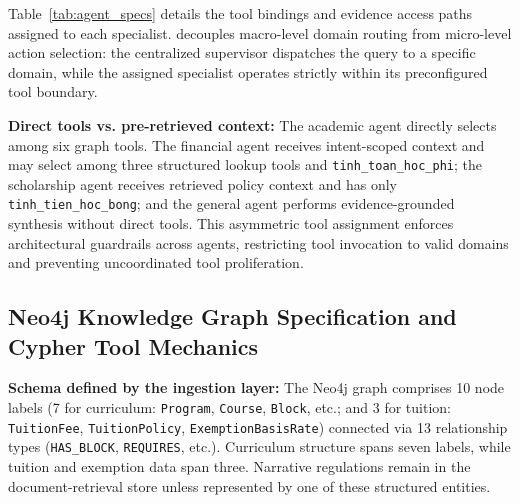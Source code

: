 Table~\ref{tab:agent_specs} details the tool bindings and evidence access paths assigned to each specialist. \system{} decouples macro-level domain routing from micro-level action selection: the centralized supervisor dispatches the query to a specific domain, while the assigned specialist operates strictly within its preconfigured tool boundary.

\begin{table}[h!]
\centering
\caption{Operational profiles and direct tool availability of the domain-specialized agents.}
\label{tab:agent_specs}
\end{table}

\textbf{Direct tools vs. pre-retrieved context:} The academic agent directly selects among six graph tools. The financial agent receives intent-scoped context and may select among three structured lookup tools and \texttt{tinh\_toan\_hoc\_phi}; the scholarship agent receives retrieved policy context and has only \texttt{tinh\_tien\_hoc\_bong}; and the general agent performs evidence-grounded synthesis without direct tools. This asymmetric tool assignment enforces architectural guardrails across agents, restricting tool invocation to valid domains and preventing uncoordinated tool proliferation.

\subsection{Neo4j Knowledge Graph Specification and Cypher Tool Mechanics}
\label{sec:neo4j_graph}

\textbf{Schema defined by the ingestion layer:}
The Neo4j graph comprises 10 node labels (7 for curriculum: \texttt{Program}, \texttt{Course}, \texttt{Block}, etc.; and 3 for tuition: \texttt{TuitionFee}, \texttt{TuitionPolicy}, \texttt{ExemptionBasisRate}) connected via 13 relationship types (\texttt{HAS\_BLOCK}, \texttt{REQUIRES}, etc.). Curriculum structure spans seven labels, while tuition and exemption data span three. Narrative regulations remain in the document-retrieval store unless represented by one of these structured entities.

